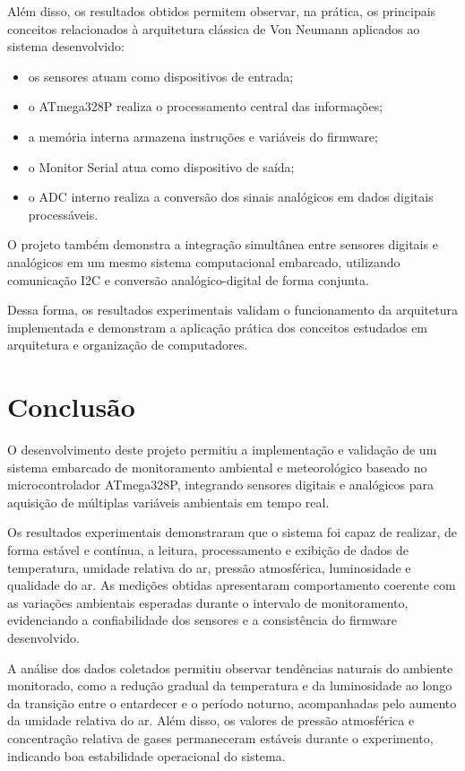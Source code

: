 \documentclass[a4paper,12pt]{article}
\begin{document}
Além disso, os resultados obtidos permitem observar, na prática, os principais conceitos relacionados à arquitetura clássica de Von Neumann aplicados ao sistema desenvolvido:
\begin{itemize}
\item os sensores atuam como dispositivos de entrada;
\item o ATmega328P realiza o processamento central das informações;
\item a memória interna armazena instruções e variáveis do firmware;
\item o Monitor Serial atua como dispositivo de saída;
\item o ADC interno realiza a conversão dos sinais analógicos em dados digitais processáveis.
\end{itemize}

O projeto também demonstra a integração simultânea entre sensores digitais e analógicos em um mesmo sistema computacional embarcado, utilizando comunicação I2C e conversão analógico-digital de forma conjunta.

Dessa forma, os resultados experimentais validam o funcionamento da arquitetura implementada e demonstram a aplicação prática dos conceitos estudados em arquitetura e organização de computadores.

\section{Conclusão}

O desenvolvimento deste projeto permitiu a implementação e validação de um sistema embarcado de monitoramento ambiental e meteorológico baseado no microcontrolador ATmega328P, integrando sensores digitais e analógicos para aquisição de múltiplas variáveis ambientais em tempo real.

Os resultados experimentais demonstraram que o sistema foi capaz de realizar, de forma estável e contínua, a leitura, processamento e exibição de dados de temperatura, umidade relativa do ar, pressão atmosférica, luminosidade e qualidade do ar. As medições obtidas apresentaram comportamento coerente com as variações ambientais esperadas durante o intervalo de monitoramento, evidenciando a confiabilidade dos sensores e a consistência do firmware desenvolvido.

A análise dos dados coletados permitiu observar tendências naturais do ambiente monitorado, como a redução gradual da temperatura e da luminosidade ao longo da transição entre o entardecer e o período noturno, acompanhadas pelo aumento da umidade relativa do ar. Além disso, os valores de pressão atmosférica e concentração relativa de gases permaneceram estáveis durante o experimento, indicando boa estabilidade operacional do sistema.
\end{document}
